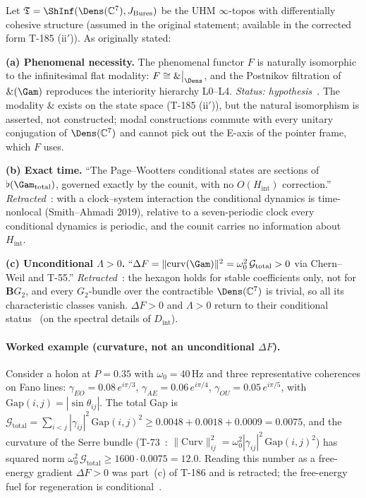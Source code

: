 \begin{theorembox}
Let $\mathfrak{T} = \ShInf(\Dens(\mathbb{C}^7), J_{\mathrm{Bures}})$ be the UHM
$\infty$-topos with differentially cohesive structure (assumed in the original statement;
available in the corrected form T-185 (ii$'$)). As originally stated:

\textbf{(a) Phenomenal necessity.} The phenomenal functor $F$ is naturally isomorphic
to the infinitesimal flat modality:
$F \cong \&\big|_{\Dens}$,
and the Postnikov filtration of $\&(\Gam)$ reproduces the interiority hierarchy L0--L4.
\emph{Status: hypothesis}~. The modality $\&$ exists on the state space
(T-185 (ii$'$)), but the natural isomorphism is asserted, not constructed; modal
constructions commute with every unitary conjugation of $\Dens(\mathbb{C}^7)$ and cannot
pick out the E-axis of the pointer frame, which $F$ uses.

\textbf{(b) Exact time.} ``The Page--Wootters conditional states are sections of
$\flat(\Gam_{\mathrm{total}})$, governed exactly by the counit, with no
$O(H_{\mathrm{int}})$ correction.'' \emph{Retracted}~\status{$\times$}: with a clock--system
interaction the conditional dynamics is time-nonlocal (Smith--Ahmadi 2019), relative to a
seven-periodic clock every conditional dynamics is periodic, and the counit carries no
information about $H_{\mathrm{int}}$.

\textbf{(c) Unconditional $\Lambda > 0$.} ``$\Delta F = \|\mathrm{curv}(\Gam)\|^2 =
\omega_0^2\,\mathcal{G}_{\mathrm{total}} > 0$ via Chern--Weil and T-55.''
\emph{Retracted}~\status{$\times$}: the hexagon holds for stable coefficients only, not for
$\mathbf{B}G_2$, and every $G_2$-bundle over the contractible $\Dens(\mathbb{C}^7)$ is
trivial, so all its characteristic classes vanish. $\Delta F > 0$ and $\Lambda > 0$ return
to their conditional status~ (on the spectral details of $D_{\mathrm{int}}$).
\end{theorembox}

\paragraph{Worked example (curvature, not an unconditional $\Delta F$).}
Consider a holon at $P = 0.35$ with $\omega_0 = 40$\,Hz and three
representative coherences on Fano lines:
$\gamma_{EO} = 0.08\,e^{i\pi/3}$,
$\gamma_{AE} = 0.06\,e^{i\pi/4}$,
$\gamma_{OU} = 0.05\,e^{i\pi/5}$,
with $\mathrm{Gap}(i,j) = |\sin\theta_{ij}|$.
The total Gap is
$\mathcal{G}_{\mathrm{total}} = \sum_{i<j}|\gamma_{ij}|^2\,\mathrm{Gap}(i,j)^2
\geq 0.0048 + 0.0018 + 0.0009 = 0.0075$,
and the curvature of the Serre bundle (T-73~:
$\|\mathrm{Curv}\|_{ij}^2 = \omega_0^2|\gamma_{ij}|^2\,\mathrm{Gap}(i,j)^2$) has squared norm
$\omega_0^2\,\mathcal{G}_{\mathrm{total}} \geq 1600 \cdot 0.0075 = 12.0$.
Reading this number as a free-energy gradient $\Delta F > 0$ was part~(c) of T-186 and is
retracted; the free-energy fuel for regeneration is conditional~.

